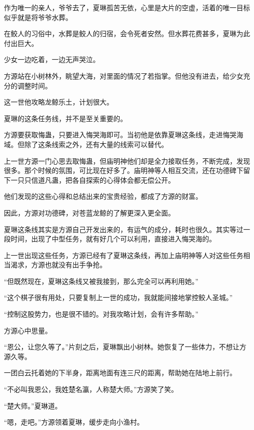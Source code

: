 \begin{this_body}
作为唯一的亲人，爷爷去了，夏琳孤苦无依，心里是大片的空虚，活着的唯一目标似乎就是将爷爷水葬。

在鲛人的习俗中，水葬是鲛人的归宿，会令死者安然。但水葬花费甚多，夏琳为此付出巨大。

少女一边吃着，一边无声哭泣。

方源站在小树林外，眺望大海，对里面的情况了若指掌。但他没有进去，给少女充分的调整时间。

这一世他攻略龙鲸乐土，计划很大。

夏琳的这条任务线，并不是至关重要的。

方源要获取悔蛊，只要进入悔哭海即可。当初他是依靠夏琳这条线，走进悔哭海域。但除了这条线索之外，还有大量的线索可以替代。

上一世方源一门心思去取悔蛊，但庙明神他们却是全力接取任务，不断完成，发现很多。那个时候的氛围，可比现在好多了。庙明神等人相互交流，还在功德碑下留下一只只信道凡蛊，把各自探索的心得体会都无偿公开。

他们发现的这些心得和总结出来的宝贵经验，都成了方源的财富。

因此，方源对功德碑，对苍蓝龙鲸的了解更深入更全面。

夏琳这条线其实是方源自己开发出来的，有运气的成分，耗时也很久。其实等过一段时间，出现了中型任务，就有好几个可以利用，直接进入悔哭海的。

上一世出现这些任务，方源已经有了夏琳这条线，再加上庙明神等人对这些任务相当渴求，方源也就没有出手争抢。

“但既然现在，夏琳这条线又被我接到，那么完全可以再利用她。”

“这个棋子很有用处，只要复制上一世的成功，我就能间接地掌控鲛人圣城。”

“控制这股势力，也是很不错的。对我攻略计划，会有许多帮助。”

方源心中思量。

“恩公，让您久等了。”片刻之后，夏琳飘出小树林。她恢复了一些体力，不想让方源久等。

一团白云托着她的下半身，距离地面有连三尺的距离，帮助她在陆地上前行。

“不必叫我恩公，我姓楚名瀛，人称楚大师。”方源笑了笑。

“楚大师。”夏琳道。

“嗯，走吧。”方源领着夏琳，缓步走向小渔村。

\end{this_body}

